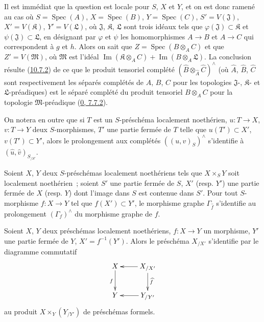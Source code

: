 Il est immédiat que la question est locale pour $S$, $X$ et $Y$, et on
est donc ramené au cas où $S=\operatorname{Spec}(A)$,
$X=\operatorname{Spec}(B)$, $Y=\operatorname{Spec}(C)$,
$S'=V(\mathfrak{J})$, $X'=V(\mathfrak{K})$, $Y'=V(\mathfrak{L})$, où
$\mathfrak{J}$, $\mathfrak{K}$, $\mathfrak{L}$ sont trois idéaux tels
que $\varphi(\mathfrak{J})\subset\mathfrak{K}$ et
$\psi(\mathfrak{J})\subset\mathfrak{L}$, en désignant par $\varphi$ et
$\psi$ les homomorphismes $A\to B$ et $A\to C$ qui correspondent à $g$
et $h$. Alors on sait que $Z=\operatorname{Spec}(B\otimes_A C)$ et que
$Z'=V(\mathfrak{M})$, où $\mathfrak{M}$ est l'idéal
$\operatorname{Im}(\mathfrak{K}\otimes_A C)
+\operatorname{Im}(B\otimes_A\mathfrak{L})$. La conclusion résulte
(\hyperref[I.10.7.2-fr]{10.7.2}) de ce que le produit tensoriel complété
$(\widehat B\otimes_{\widehat A}\widehat C)^\wedge$ (où $\widehat A$,
$\widehat B$, $\widehat C$ sont respectivement les séparés complétés de
$A$, $B$, $C$ pour les topologies $\mathfrak{J}$-, $\mathfrak{K}$- et
$\mathfrak{L}$-préadiques) est le séparé complété du produit tensoriel
$B\otimes_A C$ pour la topologie $\mathfrak{M}$-préadique
(\hyperref[0.7.7.2-fr]{0, 7.7.2}).

On notera en outre que si $T$ est un $S$-préschéma localement
noethérien, $u:T\to X$, $v:T\to Y$ deux $S$-morphismes, $T'$ une partie
fermée de $T$ telle que $u(T')\subset X'$, $v(T')\subset Y'$, alors le
prolongement aux complétés $((u,v)_S)^\wedge$ s'identifie à
$(\widehat u,\widehat v)_{S_{/S'}}$.

\begin{corollary}[10.9.8]
\label{I.10.9.8-fr}
Soient $X$, $Y$ deux $S$-préschémas localement noethériens tels que
$X\times_S Y$ soit localement noethérien~; soient $S'$ une partie fermée
de $S$, $X'$ (resp. $Y'$) une partie fermée de $X$ (resp. $Y$) dont
l'image dans $S$ est contenue dans $S'$. Pour tout $S$-morphisme
$f:X\to Y$ tel que $f(X')\subset Y'$, le morphisme graphe
$\Gamma_{\widehat f}$ s'identifie au prolongement $(\Gamma_f)^\wedge$ du
morphisme graphe de $f$.
\end{corollary}

\begin{corollary}[10.9.9]
\label{I.10.9.9-fr}
Soient $X$, $Y$ deux préschémas localement noethériens, $f:X\to Y$ un
morphisme, $Y'$ une partie fermée de $Y$, $X'=f^{-1}(Y')$. Alors le
préschéma $X_{/X'}$ s'identifie par le diagramme commutatif
\[
  \label{I.10.9.9.1-fr}
  \xymatrix{
    X\ar[d]_f &
    X_{/X'}\ar[l]\ar[d]^{\widehat f}\\
    Y &
    Y_{/Y'}\ar[l]
  }
\]
au produit $X\times_Y(Y_{/Y'})$ de préschémas formels.
\end{corollary}

